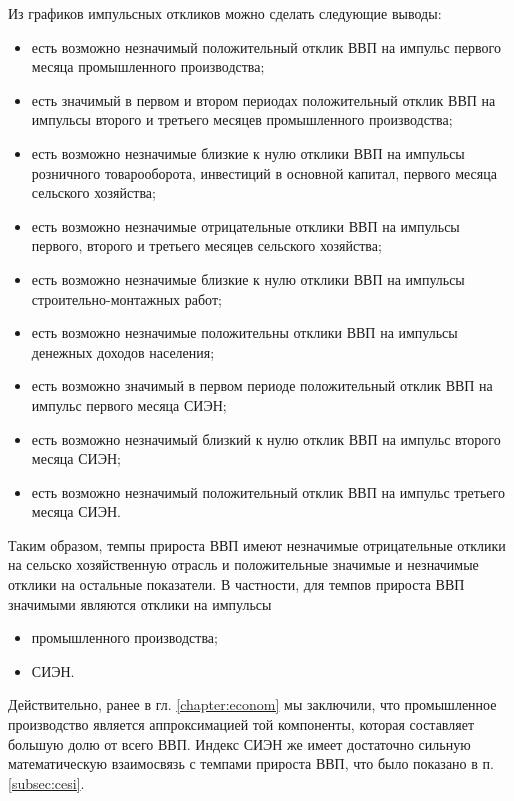 \documentclass[a4paper, 14pt]{extreport}
\numberwithin{equation}{section}
\numberwithin{equation}{section}
\begin{document}
	Из графиков импульсных откликов можно сделать следующие выводы:
	\begin{itemize}
		\item есть возможно незначимый положительный отклик ВВП на импульс первого месяца промышленного производства;
		\item есть значимый в первом и втором периодах положительный отклик ВВП на импульсы второго и третьего месяцев промышленного производства;
		
		\item есть возможно незначимые близкие к нулю отклики ВВП на импульсы розничного товарооборота, инвестиций в основной капитал, первого месяца сельского хозяйства;
		
		\item есть возможно незначимые отрицательные отклики ВВП на импульсы первого, второго и третьего месяцев сельского хозяйства;
		
		\item есть возможно незначимые близкие к нулю отклики ВВП на импульсы строительно-монтажных работ;
		
		\item есть возможно незначимые положительны отклики ВВП на импульсы денежных доходов населения; 
		
		\item есть возможно значимый в первом периоде положительный отклик ВВП на импульс первого месяца СИЭН;
		\item есть возможно незначимый близкий к нулю отклик ВВП на импульс второго месяца СИЭН;
		\item есть возможно незначимый положительный отклик ВВП на импульс третьего месяца СИЭН. 
	\end{itemize}

	Таким образом, темпы прироста ВВП имеют незначимые отрицательные отклики на сельско хозяйственную отрасль и положительные значимые и незначимые отклики на остальные показатели. В частности, для темпов прироста ВВП значимыми являются отклики на импульсы
	\begin{itemize}
		\item промышленного производства;
		\item СИЭН.
	\end{itemize}
	Действительно, ранее в гл. \ref{chapter:econom} мы заключили, что промышленное производство является аппроксимацией той компоненты, которая составляет большую долю от всего ВВП. Индекс СИЭН же имеет достаточно сильную математическую взаимосвязь с темпами прироста ВВП, что было показано в п. \ref{subsec:cesi}.
	
\end{document}
